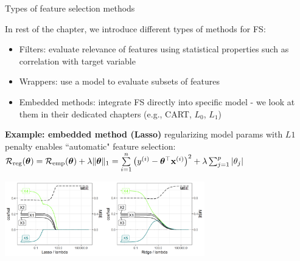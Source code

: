 \documentclass[11pt,compress,t,notes=noshow, xcolor=table]{beamer}
\begin{document}
% 


\begin{vbframe}{Types of feature selection methods}

In rest of the chapter, we introduce different types of methods for FS:

\begin{itemize}
\item Filters: evaluate relevance of features using statistical properties such as correlation with target variable
\item Wrappers: use a model to evaluate subsets of features
\item Embedded methods: integrate FS directly into specific model - we look at them in their dedicated chapters (e.g., CART, $L_0$, $L_1$)
\end{itemize}

    \textbf{Example: embedded method (Lasso)} regularizing model params with $L1$ penalty %
    enables ``automatic" feature selection:
    \vspace{-0.28cm}
    $ \mathcal{R}_{\text{reg}}(\bm{\theta}) = \mathcal{R}_{\text{emp}}(\bm{\theta}) + \lambda \|\bm{\theta}\|_1 = \sum\limits_{i=1}^n \left(y^{(i)} - \bm{\theta}^\top \mathbf{x}^{(i)} \right)^2 +\lambda \sum_{j=1}^p |\theta_j| $
\vspace{0.1cm}
\begin{center}
\includegraphics[width=0.65\textwidth]{sl/feature-selection/figure/regu_example_lasso_ridge.png}
\end{center}


\end{vbframe}



\endlecture
\end{document}
